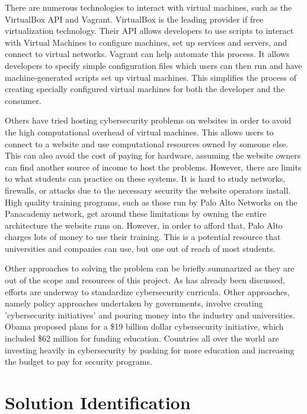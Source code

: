 \documentclass[openright]{report}
\begin{document}
\par There are numerous technologies to interact with virtual machines, such as the VirtualBox API and Vagrant. VirtualBox is the leading provider if free virtualization technology. Their API allows developers to use scripts to interact with Virtual Machines to configure machines, set up services and servers, and connect to virtual networks\cite{vb_api}. Vagrant can help automate this process. It allows developers to specify simple configuration files which users can then run and have machine-generated scripts set up  virtual machines\cite{vagrant}. This simplifies the process of creating specially configured virtual machines for both the developer and the consumer.

\par Others have tried hosting cybersecurity problems on websites in order to avoid the high computational overhead of virtual machines\cite{website_probs}. This allows users to connect to a website and use computational resources owned by someone else. This can also avoid the cost of paying for hardware, assuming the website owners can find another source of income to host the problems. However, there are limits to what students can practice on these systems. It is hard to study networks, firewalls, or attacks due to the necessary security the website operators install. High quality training programs, such as those run by Palo Alto Networks on the Panacademy network, get around these limitations by owning the entire architecture the website runs on. However, in order to afford that, Palo Alto charges lots of money to use their training\cite{palo_alto}. This is a potential resource that universities and companies can use, but one out of reach of most students.

\par Other approaches to solving the problem can be briefly summarized as they are out of the scope and resources of this project. As has already been discussed, efforts are underway to standardize cybersecurity curricula. Other approaches, namely policy approaches undertaken by governments, involve creating 'cybersecurity initiatives' and pouring money into the industry and universities. Obama proposed plans for a \$19 billion dollar cybersecurity initiative, which included \$62 million for funding education\cite{why_no_cyber_classes}. Countries all over the world are investing heavily in cybersecurity by pushing for more education and increasing the budget to pay for security programs.

\chapter{Solution Identification}
\end{document}
